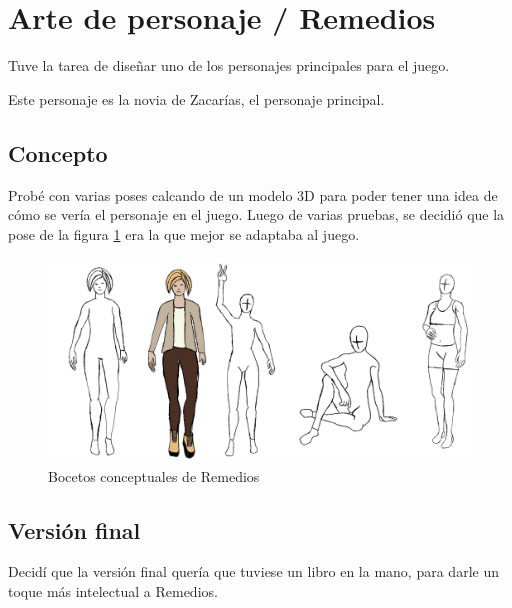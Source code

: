 \documentclass[12pt]{article}
\begin{document}
\section{Arte de personaje / Remedios}
    Tuve la tarea de diseñar uno de los personajes principales para el juego.

    Este personaje es la novia de Zacarías, el personaje principal.
    \subsection{Concepto}
        Probé con varias poses calcando de un modelo 3D para poder tener una idea de cómo se vería el personaje en el juego. Luego de varias pruebas, se decidió que la pose de la figura \ref{fig:remedios} era la que mejor se adaptaba al juego.

        \begin{figure}[H]
            \centering
            \includegraphics[width=\textwidth]{imgs/remedios_libro_arte.png}
            \caption{Bocetos conceptuales de Remedios}
            \label{fig:remedios}
        \end{figure}

    \newpage
    \subsection{Versión final}
        Decidí que la versión final quería que tuviese un libro en la mano, para darle un toque más intelectual a Remedios.
\end{document}
